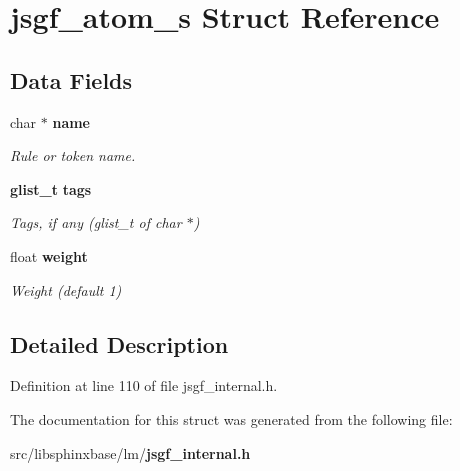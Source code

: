 \section{jsgf\-\_\-atom\-\_\-s Struct Reference}
\label{structjsgf__atom__s}
\subsection*{Data Fields}
\begin{DoxyCompactItemize}
\item 
char $\ast$ {\bf name}\label{structjsgf__atom__s_ac7473e48f49258c5e5ef65bbb669b19e}

\begin{DoxyCompactList}\small\item\em Rule or token name. \end{DoxyCompactList}\item 
{\bf glist\-\_\-t} {\bf tags}\label{structjsgf__atom__s_a4ecab128d84fd748efe52e338e7e2ecb}

\begin{DoxyCompactList}\small\item\em Tags, if any (glist\-\_\-t of char $\ast$) \end{DoxyCompactList}\item 
float {\bf weight}\label{structjsgf__atom__s_a50672ba6d1e24c55bf8b58b97114effa}

\begin{DoxyCompactList}\small\item\em Weight (default 1) \end{DoxyCompactList}\end{DoxyCompactItemize}


\subsection{Detailed Description}


Definition at line 110 of file jsgf\-\_\-internal.\-h.



The documentation for this struct was generated from the following file\-:\begin{DoxyCompactItemize}
\item 
src/libsphinxbase/lm/{\bf jsgf\-\_\-internal.\-h}\end{DoxyCompactItemize}
